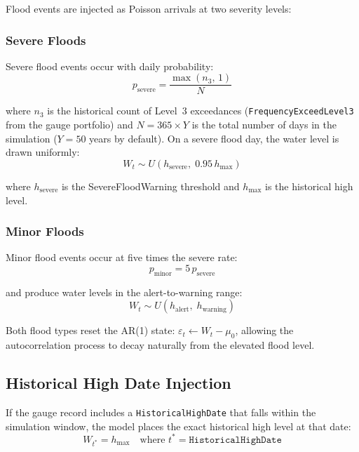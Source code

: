 \documentclass[11pt,a4paper]{article}
\begin{document}
Flood events are injected as Poisson arrivals at two severity levels:

\subsubsection{Severe Floods}

Severe flood events occur with daily probability:
\begin{equation}
    p_{\text{severe}} = \frac{\max(n_3,\, 1)}{N}
    \label{eq:severe_prob}
\end{equation}

\noindent where $n_3$ is the historical count of Level~3 exceedances
(\texttt{FrequencyExceedLevel3} from the gauge portfolio) and $N = 365 \times Y$ is the
total number of days in the simulation ($Y = 50$ years by default). On a severe flood
day, the water level is drawn uniformly:
\begin{equation}
    W_t \sim U\!\left(h_{\text{severe}},\; 0.95\,h_{\text{max}}\right)
    \label{eq:severe_level}
\end{equation}

\noindent where $h_{\text{severe}}$ is the SevereFloodWarning threshold and $h_{\text{max}}$
is the historical high level.

\subsubsection{Minor Floods}

Minor flood events occur at five times the severe rate:
\begin{equation}
    p_{\text{minor}} = 5\,p_{\text{severe}}
    \label{eq:minor_prob}
\end{equation}

\noindent and produce water levels in the alert-to-warning range:
\begin{equation}
    W_t \sim U\!\left(h_{\text{alert}},\; h_{\text{warning}}\right)
    \label{eq:minor_level}
\end{equation}

Both flood types reset the AR(1) state: $\varepsilon_t \leftarrow W_t - \mu_0$, allowing
the autocorrelation process to decay naturally from the elevated flood level.

\subsection{Historical High Date Injection}

If the gauge record includes a \texttt{HistoricalHighDate} that falls within the
simulation window, the model places the exact historical high level at that date:
\begin{equation}
    W_{t^*} = h_{\text{max}} \quad \text{where } t^* = \texttt{HistoricalHighDate}
    \label{eq:hist_high}
\end{equation}
\end{document}

